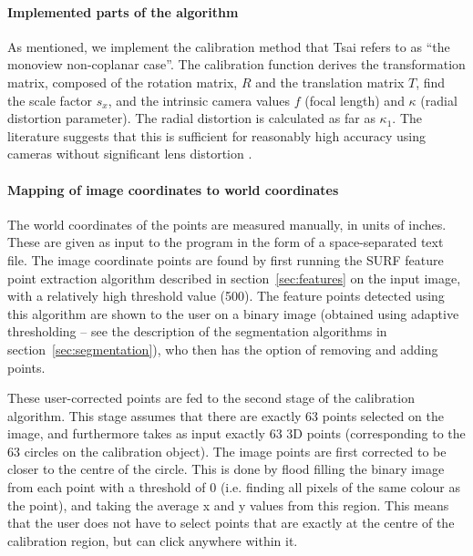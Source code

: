 \paragraph{Implemented parts of the algorithm}
As mentioned, we implement the calibration method that Tsai refers to
as ``the monoview non-coplanar case''. The calibration function derives
the transformation matrix, composed of the rotation matrix, $R$ and
the translation matrix $T$, find the scale factor $s_x$, and the
intrinsic camera values $f$ (focal length) and $\kappa$ (radial
distortion parameter). The radial distortion is calculated as far as
$\kappa_1$. The literature suggests that this is sufficient for
reasonably high accuracy using cameras without significant lens
distortion \cite{algebraic-distortion}.

\paragraph{Mapping of image coordinates to world coordinates}
The world coordinates of the points are measured manually, in units of
inches. These are given as input to the program in the form of a
space-separated text file. The image coordinate points are found by
first running the SURF feature point extraction algorithm described in
section~\ref{sec:features} on the input image, with a relatively high
threshold value (500). The feature points detected using this
algorithm are shown to the user on a binary image (obtained using
adaptive thresholding -- see the description of the segmentation
algorithms in section~\ref{sec:segmentation}), who then has the option
of removing and adding points.

These user-corrected points are fed to the second stage of the
calibration algorithm. This stage assumes that there are exactly 63
points selected on the image, and furthermore takes as input exactly
63 3D points (corresponding to the 63 circles on the calibration
object). The image points are first corrected to be closer to the
centre of the circle. This is done by flood filling the binary image
from each point with a threshold of 0 (i.e. finding all pixels of the
same colour as the point), and taking the average x and y values from
this region. This means that the user does not have to select points
that are exactly at the centre of the calibration region, but can
click anywhere within it.

